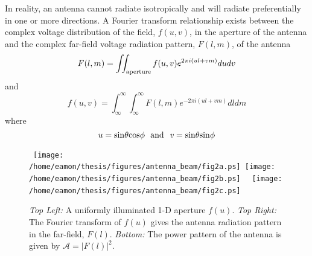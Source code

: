 In reality, an antenna cannot radiate isotropically and will radiate preferentially in one or more directions. A Fourier transform relationship exists between the complex voltage distribution of the field, $f(u,v)$, in the aperture of the antenna and the complex far-field voltage radiation pattern, $F(l,m)$, of the antenna \citep{kraus_1986}
\begin{equation}
F(l,m)=\int\!\!\! \int _{\rm{aperture}} f(u,v)e^{2\pi i(ul+vm)}dudv
\end{equation}
and
\begin{equation}\label{eq:illum1}
f(u,v)=\int ^{\infty} _{\infty}\int ^{\infty} _{\infty} F(l,m)e^{-2\pi i(ul+vm)}dldm
\end{equation}
where
\begin{equation}\label{eq:illum2}
u=\rm{sin}\theta \rm{cos}\phi \ \  \rm{and} \ \ \mathit{v}=\rm{sin}\theta \rm{sin}\phi
\end{equation}

\begin{figure}[hbt!]
\centering 
\mbox{
          \texttt{[image: /home/eamon/thesis/figures/antenna\_beam/fig2a.ps]}
          \texttt{[image: /home/eamon/thesis/figures/antenna\_beam/fig2b.ps]}
          }
\mbox{
          \texttt{[image: /home/eamon/thesis/figures/antenna\_beam/fig2c.ps]}
          }
\caption[Radiation and power pattern of a uniformly illuminated antenna.]{\textit{Top Left:} A uniformly illuminated 1-D aperture $f(u)$. \textit{Top Right:} The Fourier transform of $f(u)$ gives the antenna radiation pattern in the far-field, $F(l)$. \textit{Bottom:} The power pattern of the antenna is given by $\mathcal{A}=|F(l)|^2$.}
\label{fig2.1}
\end{figure}

